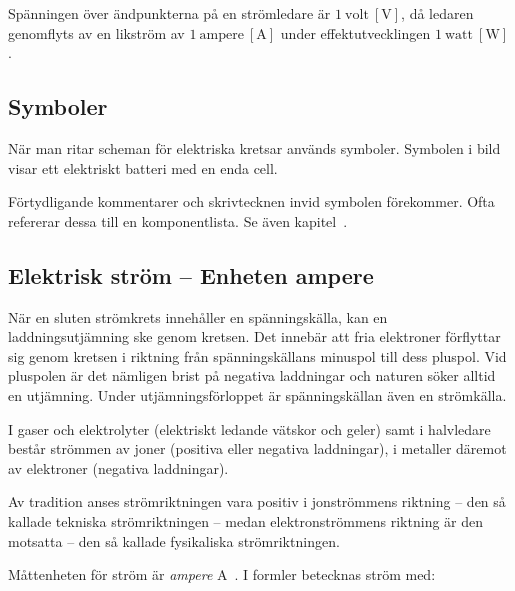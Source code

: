 Spänningen över ändpunkterna på en strömledare är \(1\ \mathrm{volt\ [V]}\), då
ledaren genomflyts av en likström av \(1\ \mathrm{ampere\ [A]}\) under
effektutvecklingen \(1\ \mathrm{watt\ [W]}\).

\subsection{Symboler}
\label{spänning.symboler}

När man ritar scheman för elektriska kretsar används symboler.
Symbolen i bild~ visar ett elektriskt batteri med en
enda cell.


Förtydligande kommentarer och skrivtecknen invid symbolen förekommer.
Ofta refererar dessa till en komponentlista.
Se även kapitel~.

\subsection{Elektrisk ström -- Enheten ampere}
\label{elektrisk_ström}

När en sluten strömkrets innehåller en spänningskälla, kan en
laddningsutjämning ske genom kretsen.
Det innebär att fria elektroner förflyttar sig genom kretsen i riktning från
spänningskällans minuspol till dess pluspol.
Vid pluspolen är det nämligen brist på negativa laddningar och naturen söker
alltid en utjämning.
Under utjämningsförloppet är spänningskällan även en strömkälla.

I gaser och elektrolyter (elektriskt ledande vätskor och geler) samt i
halvledare består strömmen av joner (positiva eller negativa laddningar),
i metaller däremot av elektroner (negativa laddningar).

Av tradition anses strömriktningen vara positiv i jonströmmens riktning -- den
så kallade tekniska strömriktningen -- medan elektronströmmens riktning är den
motsatta -- den så kallade fysikaliska strömriktningen.

Måttenheten för ström är \emph{ampere} \(\mathrm{A}\)~\cite{SIbrochure8}.
I formler betecknas ström med:

